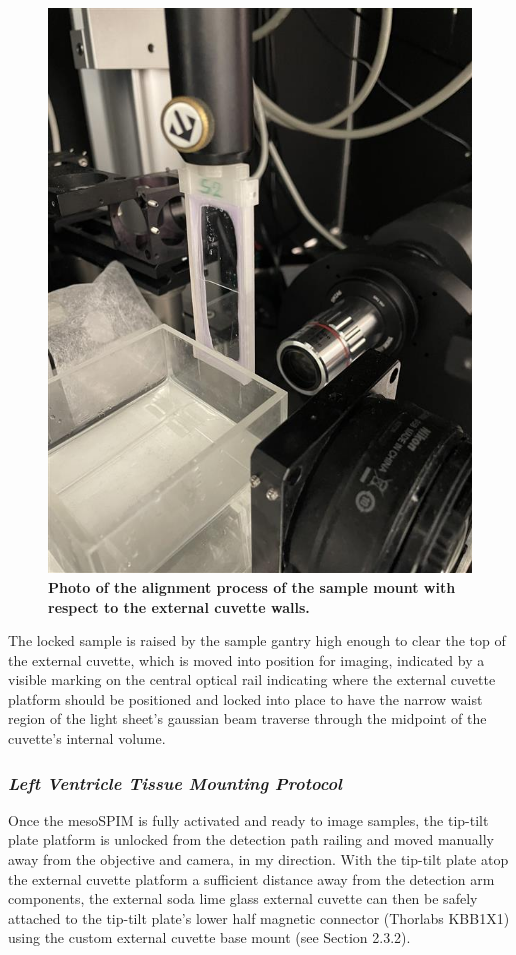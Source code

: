 \begin{figure}[H]
    \centering
    \includegraphics[width=0.5\linewidth]{Images/Alignment_Photo.jpg}
    \caption{\textbf{Photo of the alignment process of the sample mount with respect to the external cuvette walls.} }
    \label{fig:enter-label}
\end{figure}

The locked sample is raised by the sample gantry high enough to clear the top of the external cuvette, which is moved into position for imaging, indicated by a visible marking on the central optical rail indicating where the external cuvette platform should be positioned and locked into place to have the narrow waist region of the light sheet's gaussian beam traverse through the midpoint of the cuvette's internal volume.


\subsubsection{\textit{Left Ventricle Tissue Mounting Protocol}}
Once the mesoSPIM is fully activated and ready to image samples, the tip-tilt plate platform is unlocked from the detection path railing and moved manually away from the objective and camera, in my direction.  With the tip-tilt plate atop the external cuvette platform a sufficient distance away from the detection arm components, the external soda lime glass external cuvette can then be safely attached to the tip-tilt plate’s lower half magnetic connector (Thorlabs KBB1X1) using the custom external cuvette base mount (see Section 2.3.2). 

